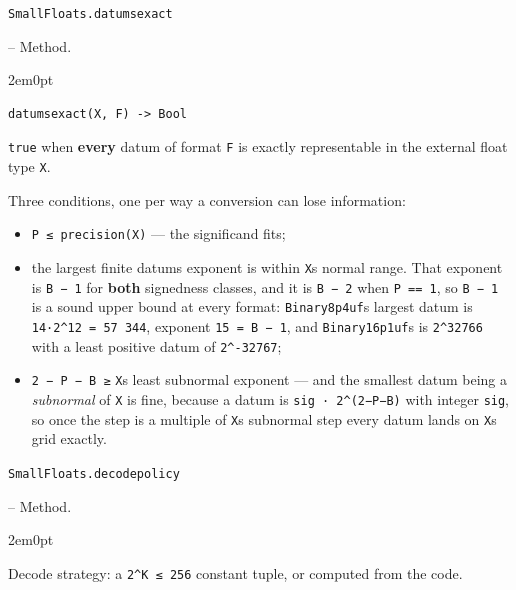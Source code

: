\par\medskip\noindent\begin{minipage}{\linewidth}
\hypertarget{5824837744343724298}{\texttt{SmallFloats.datumsexact}}  -- {Method.}
\nopagebreak
\begin{adjustwidth}{2em}{0pt}


\begin{verbatim}
datumsexact(X, F) -> Bool
\end{verbatim}

\texttt{true} when \textbf{every} datum of format \texttt{F} is exactly representable in the external float type \texttt{X}.

Three conditions, one per way a conversion can lose information:

\begin{itemize}
\item \texttt{P ≤ precision(X)} — the significand fits;


\item the largest finite datum{\textquotesingle}s exponent is within \texttt{X}{\textquotesingle}s normal range. That exponent is \texttt{B − 1} for \textbf{both} signedness classes, and it is \texttt{B − 2} when \texttt{P == 1}, so \texttt{B − 1} is a sound upper bound at every format: \texttt{Binary8p4uf}{\textquotesingle}s largest datum is \texttt{14·2{\textasciicircum}12 = 57 344}, exponent \texttt{15 = B − 1}, and \texttt{Binary16p1uf}{\textquotesingle}s is \texttt{2{\textasciicircum}32766} with a least positive datum of \texttt{2{\textasciicircum}-32767};


\item \texttt{2 − P − B ≥} \texttt{X}{\textquotesingle}s least subnormal exponent — and the smallest datum being a \emph{subnormal} of \texttt{X} is fine, because a datum is \texttt{sig · 2{\textasciicircum}(2−P−B)} with integer \texttt{sig}, so once the step is a multiple of \texttt{X}{\textquotesingle}s subnormal step every datum lands on \texttt{X}{\textquotesingle}s grid exactly.

\end{itemize}


\end{adjustwidth}
\end{minipage}
\par\medskip

\par\medskip\noindent\begin{minipage}{\linewidth}
\hypertarget{9427357598855955389}{\texttt{SmallFloats.decodepolicy}}  -- {Method.}
\nopagebreak
\begin{adjustwidth}{2em}{0pt}

Decode strategy: a \texttt{2{\textasciicircum}K ≤ 256} constant tuple, or computed from the code.



\end{adjustwidth}
\end{minipage}
\par\medskip

